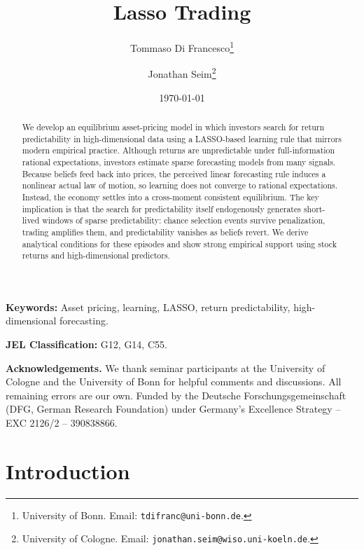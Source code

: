 \documentclass[11pt]{article}
\title{\textbf{Lasso Trading}}
\author{
Tommaso Di Francesco\thanks{University of Bonn. Email: \texttt{tdifranc@uni-bonn.de}.}
\and
Jonathan Seim\thanks{University of Cologne. Email: \texttt{jonathan.seim@wiso.uni-koeln.de}.}
}
\date{\today}
\begin{document}
\maketitle

\begin{abstract}
\noindent
We develop an equilibrium asset-pricing model in which investors search for return predictability in high-dimensional data using a LASSO-based learning rule that mirrors modern empirical practice.
Although returns are unpredictable under full-information rational expectations, investors estimate sparse forecasting models from many signals.
Because beliefs feed back into prices, the perceived linear forecasting rule induces a nonlinear actual law of motion, so learning does not converge to rational expectations.
Instead, the economy settles into a cross-moment consistent equilibrium.
The key implication is that the search for predictability itself endogenously generates short-lived windows of sparse predictability: chance selection events survive penalization, trading amplifies them, and predictability vanishes as beliefs revert.
We derive analytical conditions for these episodes and show strong empirical support using stock returns and high-dimensional predictors.
\end{abstract}

\vspace{0.5cm}

\noindent\textbf{Keywords:} Asset pricing, learning, LASSO, return predictability, high-dimensional forecasting.  

\noindent\textbf{JEL Classification:} G12, G14, C55.

\vspace{1.0cm}

\noindent\textbf{Acknowledgements.}
We thank seminar participants at the University of Cologne and the University of Bonn for helpful comments and discussions.
All remaining errors are our own.
Funded by the Deutsche Forschungsgemeinschaft (DFG, German Research Foundation) under
Germany’s Excellence Strategy – EXC 2126/2 – 390838866.

\newpage

\section{Introduction}
\end{document}
